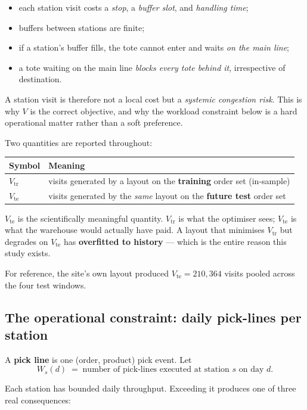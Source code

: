 \documentclass[11pt,a4paper]{article}
\newcommand{\vtr}{V_{\mathrm{tr}}}
\newcommand{\vte}{V_{\mathrm{te}}}
\begin{document}
\begin{itemize}
  \item each station visit costs a \emph{stop}, a \emph{buffer slot}, and \emph{handling time};
  \item buffers between stations are finite;
  \item if a station's buffer fills, the tote cannot enter and waits \emph{on the main line};
  \item a tote waiting on the main line \emph{blocks every tote behind it}, irrespective of destination.
\end{itemize}

A station visit is therefore not a local cost but a \emph{systemic congestion
risk}. This is why $V$ is the correct objective, and why the workload
constraint below is a hard operational matter rather than a soft preference.

Two quantities are reported throughout:

\begin{center}
\begin{tabular}{ll}
\toprule
Symbol & Meaning \\
\midrule
$\vtr$ & visits generated by a layout on the \textbf{training} order set (in-sample) \\
$\vte$ & visits generated by the \emph{same} layout on the \textbf{future test} order set \\
\bottomrule
\end{tabular}
\end{center}

$\vte$ is the scientifically meaningful quantity. $\vtr$ is what the optimiser
sees; $\vte$ is what the warehouse would actually have paid. A layout that
minimises $\vtr$ but degrades on $\vte$ has \textbf{overfitted to history} ---
which is the entire reason this study exists.

For reference, the site's own layout produced $\vte = 210{,}364$ visits pooled
across the four test windows.

\subsection{The operational constraint: daily pick-lines per station}

A \textbf{pick line} is one (order, product) pick event. Let
\[
  W_s(d) \;=\; \text{number of pick-lines executed at station } s \text{ on day } d .
\]

Each station has bounded daily throughput. Exceeding it produces one of three
real consequences:
\end{document}
